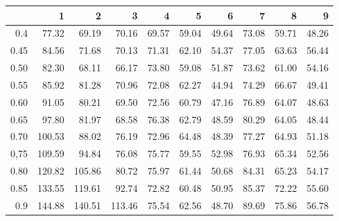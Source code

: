 \begin{table}[ht]
\centering
\begin{tabular}{rrrrrrrrrr}
  \hline
 & 1 & 2 & 3 & 4 & 5 & 6 & 7 & 8 & 9 \\ 
  \hline
0.4 & 77.32 & 69.19 & 70.16 & 69.57 & 59.04 & 49.64 & 73.08 & 59.71 & 48.26 \\ 
  0.45 & 84.56 & 71.68 & 70.13 & 71.31 & 62.10 & 54.37 & 77.05 & 63.63 & 56.44 \\ 
  0.50 & 82.30 & 68.11 & 66.17 & 73.80 & 59.08 & 51.87 & 73.62 & 61.00 & 54.16 \\ 
  0.55 & 85.92 & 81.28 & 70.96 & 72.08 & 62.27 & 44.94 & 74.29 & 66.67 & 49.41 \\ 
  0.60 & 91.05 & 80.21 & 69.50 & 72.56 & 60.79 & 47.16 & 76.89 & 64.07 & 48.63 \\ 
  0.65 & 97.80 & 81.97 & 68.58 & 76.38 & 62.79 & 48.59 & 80.29 & 64.05 & 48.44 \\ 
  0.70 & 100.53 & 88.02 & 76.19 & 72.96 & 64.48 & 48.39 & 77.27 & 64.93 & 51.18 \\ 
  0,75 & 109.59 & 94.84 & 76.08 & 75.77 & 59.55 & 52.98 & 76.93 & 65.34 & 52.56 \\ 
  0.80 & 120.82 & 105.86 & 80.72 & 75.97 & 61.44 & 50.68 & 84.31 & 65.23 & 54.17 \\ 
  0.85 & 133.55 & 119.61 & 92.74 & 72.82 & 60.48 & 50.95 & 85.37 & 72.22 & 55.60 \\ 
  0.9 & 144.88 & 140.51 & 113.46 & 75.54 & 62.56 & 48.70 & 89.69 & 75.86 & 56.78 \\ 
   \hline
\end{tabular}
\end{table}
